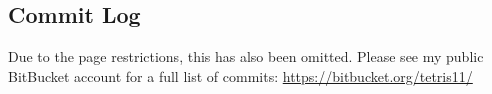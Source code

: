 %
%
%
%
%
%
%

%

%

%

%

%

%

%

\subsection{Commit Log}\label{commits}
Due to the page restrictions, this has also been omitted. Please see my public BitBucket account for a full list of commits:
\tab\url{https://bitbucket.org/tetris11/}

